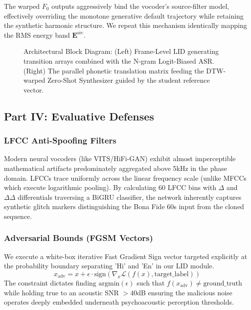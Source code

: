 \documentclass[10pt,conference]{IEEEtran}
\begin{document}
The warped $F_0$ outputs aggressively bind the vocoder's source-filter model, effectively overriding the monotone generative default trajectory while retaining the synthetic harmonic structure. We repeat this mechanism identically mapping the RMS energy band $\mathbf{E}^{\text{src}}$.

\begin{figure}[t]
\centering
\fbox{\rule{0pt}{2in} \rule{0.9\linewidth}{0pt}}
\caption{Architectural Block Diagram: (Left) Frame-Level LID generating transition arrays combined with the N-gram Logit-Biased ASR. (Right) The parallel phonetic translation matrix feeding the DTW-warped Zero-Shot Synthesizer guided by the student reference vector.}
\label{fig:arch}
\end{figure}


\subsection{Part IV: Evaluative Defenses}

\subsubsection{LFCC Anti-Spoofing Filters}
Modern neural vocoders (like VITS/HiFi-GAN) exhibit almost imperceptible mathematical artifacts predominately aggregated above 5kHz in the phase domain. LFCCs trace uniformly across the linear frequency scale (unlike MFCCs which execute logarithmic pooling). By calculating 60 LFCC bins with $\Delta$ and $\Delta\Delta$ differentials traversing a BiGRU classifier, the network inherently captures synthetic glitch markers distinguishing the Bona Fide 60s input from the cloned sequence.

\subsubsection{Adversarial Bounds (FGSM Vectors)}
We execute a white-box iterative Fast Gradient Sign vector targeted explicitly at the probability boundary separating 'Hi' and 'En' in our LID module.
\begin{equation}
x_{\text{adv}} = x + \epsilon \cdot \text{sign}(\nabla_x \mathcal{L}(f(x), \text{target\_label}))
\end{equation}
The constraint dictates finding $\text{argmin} (\epsilon)$ such that $f(x_{\text{adv}}) \neq \text{ground\_truth}$ while holding true to an acoustic SNR $> 40$dB ensuring the malicious noise operates deeply embedded underneath psychoacoustic perception thresholds.
\end{document}
